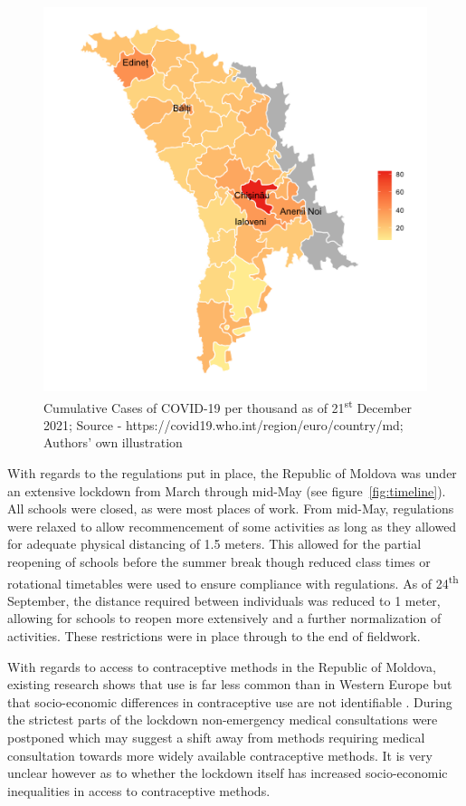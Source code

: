 \documentclass[10pt,letterpaper]{article}
\begin{document}
\begin{figure}
\centering
\includegraphics[width=\textwidth]{fig1.png}
\caption{Cumulative Cases of COVID-19 per thousand as of 21\textsuperscript{st} December 2021; Source - https://covid19.who.int/region/euro/country/md; Authors' own illustration}
\label{fig:map}
\end{figure}

With regards to the regulations put in place, the Republic of Moldova was under an extensive lockdown from March through mid-May (see figure~\ref{fig:timeline}). All schools were closed, as were most places of work. From mid-May, regulations were relaxed to allow recommencement of some activities as long as they allowed for adequate physical distancing of 1.5 meters. This allowed for the partial reopening of schools before the summer break though reduced class times or rotational timetables were used to ensure compliance with regulations. As of 24\textsuperscript{th} September, the distance required between individuals was reduced to 1 meter, allowing for schools to reopen more extensively and a further normalization of activities. These restrictions were in place through to the end of fieldwork.

With regards to access to contraceptive methods in the Republic of Moldova, existing research shows that use is far less common than in Western Europe but that socio-economic differences in contraceptive use are not identifiable \cite{janevic2012individual}. During the strictest parts of the lockdown non-emergency medical consultations were postponed which may suggest a shift away from methods requiring medical consultation towards more widely available contraceptive methods. It is very unclear however as to whether the lockdown itself has increased socio-economic inequalities in access to contraceptive methods.
\end{document}
